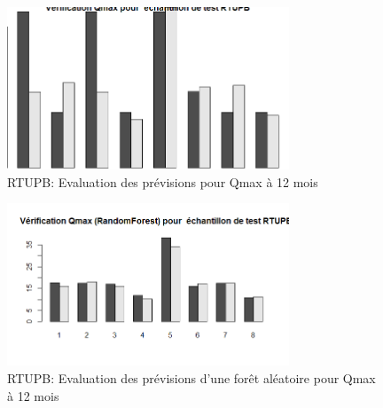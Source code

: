 \begin{figure}[H]
\centering
\includegraphics[width=0.75\textwidth]{../Fig/RTUPB/rtupb-regtree-test-qmax12.png}
\caption{RTUPB: Evaluation des prévisions pour Qmax à 12 mois}
\label{fig-rtupb-regtree-test-qmax12}
\end{figure}

\begin{figure}[H]
\centering
\includegraphics[width=0.75\textwidth]{../Fig/RTUPB/rtupb-forest-test-qmax12.png}
\caption{RTUPB: Evaluation des prévisions d'une forêt aléatoire pour Qmax à 12 mois}
\label{fig-rtupb-forest-test-qmax12}
\end{figure}

